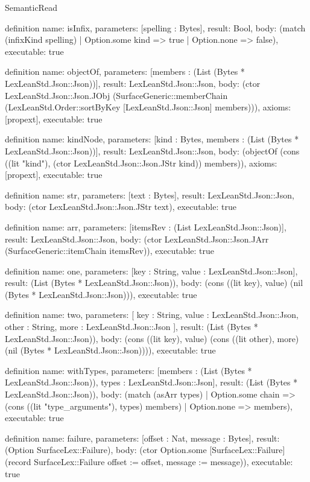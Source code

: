 \begin{lexlean}{SemanticRead}
\begin{semanticmodule}
definition{
  name: isInfix,
  parameters: [spelling : Bytes],
  result: Bool,
  body: (match (infixKind spelling) | Option.some kind => true | Option.none => false),
  executable: true
}

definition{
  name: objectOf,
  parameters: [members : (List (Bytes * LexLeanStd.Json::Json))],
  result: LexLeanStd.Json::Json,
  body: (ctor LexLeanStd.Json::Json.JObj (SurfaceGeneric::memberChain (LexLeanStd.Order::sortByKey [LexLeanStd.Json::Json] members))),
  axioms: [propext],
  executable: true
}

definition{
  name: kindNode,
  parameters: [kind : Bytes, members : (List (Bytes * LexLeanStd.Json::Json))],
  result: LexLeanStd.Json::Json,
  body: (objectOf (cons ((lit "kind"), (ctor LexLeanStd.Json::Json.JStr kind)) members)),
  axioms: [propext],
  executable: true
}

definition{
  name: str,
  parameters: [text : Bytes],
  result: LexLeanStd.Json::Json,
  body: (ctor LexLeanStd.Json::Json.JStr text),
  executable: true
}

definition{
  name: arr,
  parameters: [itemsRev : (List LexLeanStd.Json::Json)],
  result: LexLeanStd.Json::Json,
  body: (ctor LexLeanStd.Json::Json.JArr (SurfaceGeneric::itemChain itemsRev)),
  executable: true
}

definition{
  name: one,
  parameters: [key : String, value : LexLeanStd.Json::Json],
  result: (List (Bytes * LexLeanStd.Json::Json)),
  body: (cons ((lit key), value) (nil (Bytes * LexLeanStd.Json::Json))),
  executable: true
}

definition{
  name: two,
  parameters: [
    key : String,
    value : LexLeanStd.Json::Json,
    other : String,
    more : LexLeanStd.Json::Json
  ],
  result: (List (Bytes * LexLeanStd.Json::Json)),
  body: (cons ((lit key), value) (cons ((lit other), more) (nil (Bytes * LexLeanStd.Json::Json)))),
  executable: true
}

definition{
  name: withTypes,
  parameters: [members : (List (Bytes * LexLeanStd.Json::Json)), types : LexLeanStd.Json::Json],
  result: (List (Bytes * LexLeanStd.Json::Json)),
  body: (match (asArr types)
    | Option.some chain => (cons ((lit "type_arguments"), types) members)
    | Option.none => members),
  executable: true
}

definition{
  name: failure,
  parameters: [offset : Nat, message : Bytes],
  result: (Option SurfaceLex::Failure),
  body: (ctor Option.some [SurfaceLex::Failure] (record SurfaceLex::Failure {offset := offset, message := message})),
  executable: true
}


\end{semanticmodule}
\end{lexlean}
